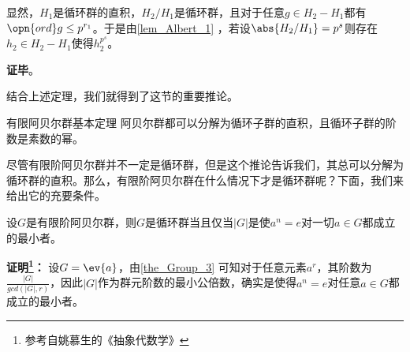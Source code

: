 显然，$H_1$是循环群的直积，$H_2/H_1$是循环群，且对于任意$g\in H_2-H_1$都有$\opn{ord}g\leq p^{r_1}$。于是由\autoref{lem_Albert_1} ，若设$\abs{H_2/H_1}=p^s$则存在$h_2\in H_2-H_1$使得$h_2^{p^s}$。



\textbf{证毕}。















结合上述定理，我们就得到了这节的重要推论。

\begin{corollary}{有限阿贝尔群基本定理}
阿贝尔群都可以分解为循环子群的直积，且循环子群的阶数是素数的幂。
\end{corollary}
尽管有限阶阿贝尔群并不一定是循环群，但是这个推论告诉我们，其总可以分解为循环群的直积。那么，有限阶阿贝尔群在什么情况下才是循环群呢？下面，我们来给出它的充要条件。
\begin{theorem}{}\label{the_cyclic_5}
设$G$是有限阶阿贝尔群，则$G$是循环群当且仅当$|G|$是使$a^n=e$对一切$a\in G$都成立的最小者。
\end{theorem}

\textbf{证明\footnote{参考自姚慕生的《抽象代数学》}：}
设$G=\ev{a}$，由\autoref{the_Group_3} 可知对于任意元素$a^r$，其阶数为$\frac{|G|}{gcd(|G|,r)}$，因此$|G|$作为群元阶数的最小公倍数，确实是使得$a^n=e$对任意$a\in G$都成立的最小者。

